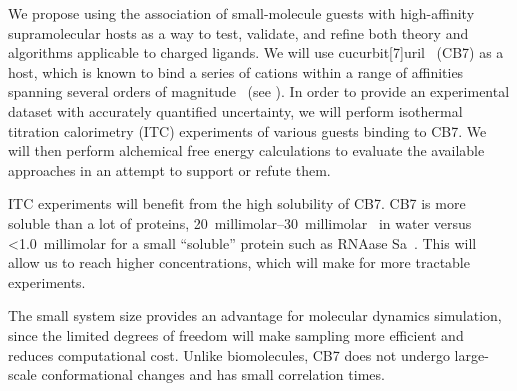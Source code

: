 \documentclass[10pt,final]{article}
\begin{document}
We propose using the association of small-molecule guests with high-affinity supramolecular hosts as a way to test, validate, and refine both theory and algorithms applicable to charged ligands.
%
We will use cucurbit[7]uril~\autocite{Lagona2005a} (CB7) as a host, which is known to bind a series of cations within a range of affinities spanning several orders of magnitude~\autocite{Cao2013a} (see ).
%
In order to provide an experimental dataset with accurately quantified uncertainty, we will perform isothermal titration calorimetry (ITC) experiments of various guests binding to CB7.
%
We will then perform alchemical free energy calculations to evaluate the available approaches in an attempt to support or refute them.

%
ITC experiments will benefit from the high solubility of CB7.
%
CB7 is more soluble than a lot of proteins, \SIrange[scientific-notation=false]{20}{30}{millimolar}~\autocite{Lagona2005a} in water versus \textless \SI{1.0}{millimolar} for a small ``soluble'' protein such as RNAase Sa~\autocite{Pace2004a}.
%
This will allow us to reach higher concentrations, which will make for more tractable experiments.

The small system size provides an advantage for molecular dynamics simulation, since the limited degrees of freedom will make sampling more efficient and reduces computational cost.
%
Unlike biomolecules, CB7 does not undergo large-scale conformational changes and has small correlation times.
\end{document}
